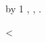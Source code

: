 \documentclass{article}
\begin{document}
\newcount\rowctr
\loop
  \advance\rowctr by 1\relax
  \Fieldi, \Fieldii, \Fieldiii.\par
\ifnum\rowctr<\DTLrowcount{\testdata}
\repeat
\end{document}
